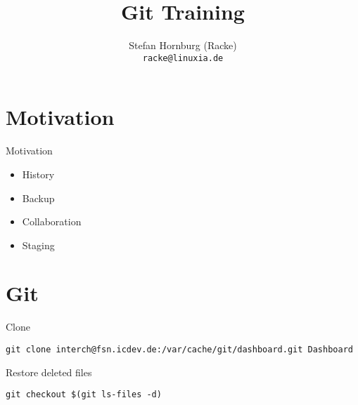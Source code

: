 \usepackage[T1]{fontenc}
\usepackage{mathptmx}
\usepackage[scaled=.90]{helvet}
\usepackage{courier}

\usepackage{beamerthemesplit}
\usepackage{verbatim}
\usepackage{hyperref}
\usepackage{listings}
\lstset{language=Perl,basicstyle=\footnotesize,tabsize=3,showstringspaces=false}

\title{Git Training}
\author[racke]{Stefan Hornburg (Racke)\\ \texttt{racke@linuxia.de}}


\maketitle{}

\begin{frame}
  \titlepage
\end{frame}

\tableofcontents

\section{Motivation}

\begin{frame}{Motivation}
  \begin{itemize}
    \item History
    \item Backup
    \item Collaboration
    \item Staging
  \end{itemize}
\end{frame}

\section{Git}
\begin{frame}[fragile]{Clone}
\begin{lstlisting}
git clone interch@fsn.icdev.de:/var/cache/git/dashboard.git Dashboard
\end{lstlisting}
\end{frame}


\begin{frame}[fragile]{Restore deleted files}
\begin{lstlisting}
git checkout $(git ls-files -d)
\end{lstlisting}
\end{frame}



